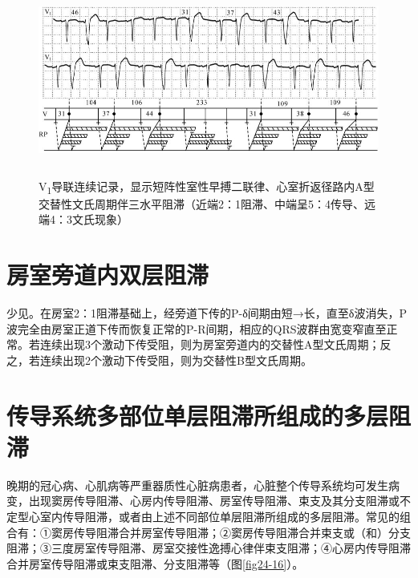 \begin{figure}[!htbp]
 \centering
 \includegraphics[width=5.70833in,height=2.46875in]{./images/Image00410.jpg}
 \captionsetup{justification=centering}
 \caption{V\textsubscript{1}导联连续记录，显示短阵性室性早搏二联律、心室折返径路内A型交替性文氏周期伴三水平阻滞（近端2：1阻滞、中端呈5：4传导、远端4：3文氏现象）}
 \label{fig24-15}
  \end{figure} 


\protect\hypertarget{text00031.htmlux5cux23subid371}{}{}

\section{房室旁道内双层阻滞}

少见。在房室2：1阻滞基础上，经旁道下传的P-δ间期由短→长，直至δ波消失，P波完全由房室正道下传而恢复正常的P-R间期，相应的QRS波群由宽变窄直至正常。若连续出现3个激动下传受阻，则为房室旁道内的交替性A型文氏周期；反之，若连续出现2个激动下传受阻，则为交替性B型文氏周期。

\protect\hypertarget{text00031.htmlux5cux23subid372}{}{}

\section{传导系统多部位单层阻滞所组成的多层阻滞}

晚期的冠心病、心肌病等严重器质性心脏病患者，心脏整个传导系统均可发生病变，出现窦房传导阻滞、心房内传导阻滞、房室传导阻滞、束支及其分支阻滞或不定型心室内传导阻滞，或者由上述不同部位单层阻滞所组成的多层阻滞。常见的组合有：①窦房传导阻滞合并房室传导阻滞；②窦房传导阻滞合并束支或（和）分支阻滞；③三度房室传导阻滞、房室交接性逸搏心律伴束支阻滞；④心房内传导阻滞合并房室传导阻滞或束支阻滞、分支阻滞等（图\ref{fig24-16}）。

